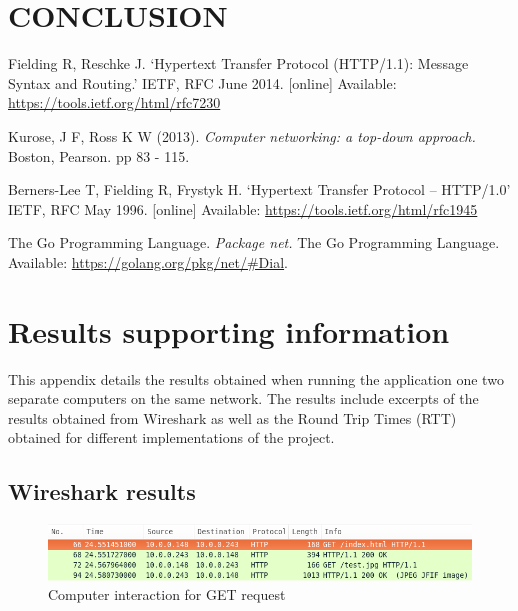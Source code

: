 \documentclass[10pt,twocolumn]{witseiepaper}
\begin{document}
\section{CONCLUSION}


\begin{thebibliography}{1}

 Fielding R, Reschke J. `Hypertext Transfer Protocol (HTTP/1.1): Message Syntax and Routing.' IETF, RFC June 2014. [online] Available: \url{https://tools.ietf.org/html/rfc7230}

 Kurose, J F, Ross K W (2013). \emph{Computer networking: a top-down approach.} Boston, Pearson. pp 83 - 115.

 Berners-Lee T, Fielding R, Frystyk H. `Hypertext Transfer Protocol -- HTTP/1.0' IETF, RFC May 1996. [online] Available: \url{https://tools.ietf.org/html/rfc1945}

 The Go Programming Language. \emph{Package net.} The Go Programming Language. Available: \url{https://golang.org/pkg/net/#Dial}.

\end{thebibliography}

\onecolumn
\clearpage
\newpage
\appendix
\section{Results supporting information} %
\label{sec:results}
	
	This appendix details the results obtained when running the application one two separate computers on the same network. The results include excerpts of the results obtained from Wireshark as well as the Round Trip Times (RTT) obtained for different implementations of the project.

	\subsection{Wireshark results} %
	\label{sub:wireshark_results}
	
		\begin{figure}[h!]
			\centering
			\includegraphics[width=\columnwidth]{resources/get_html}
			\caption{Computer interaction for GET request}
			\label{fig:basic_get}
		\end{figure}
		
\end{document}
